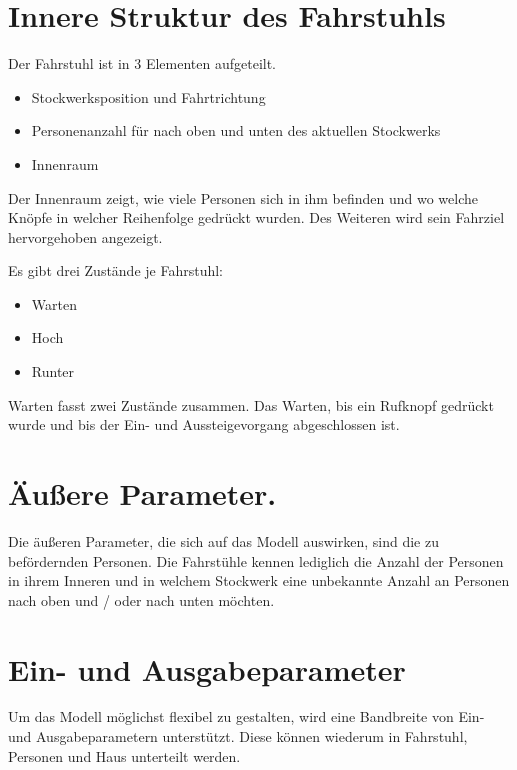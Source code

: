 \documentclass[envcountsame, envcountchap, deutsch]{i-studis}
\providecommand{\tightlist}{%
  \setlength{\itemsep}{0pt}\setlength{\parskip}{0pt}}
\begin{document}
\hypertarget{innere-struktur-des-fahrstuhls}{%
\section{Innere Struktur des
Fahrstuhls}\label{innere-struktur-des-fahrstuhls}}

Der Fahrstuhl ist in 3 Elementen aufgeteilt.

\begin{itemize}
\tightlist
\item
  Stockwerksposition und Fahrtrichtung
\item
  Personenanzahl für nach oben und unten des aktuellen Stockwerks
\item
  Innenraum
\end{itemize}

Der Innenraum zeigt, wie viele Personen sich in ihm befinden und wo
welche Knöpfe in welcher Reihenfolge gedrückt wurden. Des Weiteren wird
sein Fahrziel hervorgehoben angezeigt.

Es gibt drei Zustände je Fahrstuhl:

\begin{itemize}
\tightlist
\item
  Warten
\item
  Hoch
\item
  Runter
\end{itemize}

Warten fasst zwei Zustände zusammen. Das Warten, bis ein Rufknopf
gedrückt wurde und bis der Ein- und Aussteigevorgang abgeschlossen ist.

\hypertarget{uxe4uuxdfere-parameter.}{%
\section{Äußere Parameter.}\label{uxe4uuxdfere-parameter.}}

Die äußeren Parameter, die sich auf das Modell auswirken, sind die zu
befördernden Personen. Die Fahrstühle kennen lediglich die Anzahl der
Personen in ihrem Inneren und in welchem Stockwerk eine unbekannte
Anzahl an Personen nach oben und / oder nach unten möchten.

\hypertarget{ein--und-ausgabeparameter}{%
\section{Ein- und Ausgabeparameter}\label{ein--und-ausgabeparameter}}

Um das Modell möglichst flexibel zu gestalten, wird eine Bandbreite von
Ein- und Ausgabeparametern unterstützt. Diese können wiederum in
Fahrstuhl, Personen und Haus unterteilt werden.
\end{document}
